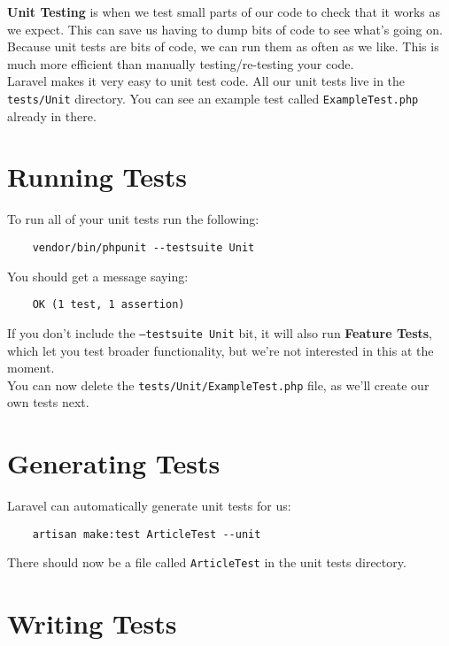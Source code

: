 \textbf{Unit Testing} is when we test small parts of our code to check that it works as we expect. This can save us having to dump bits of code to see what's going on.
\\

Because unit tests are bits of code, we can run them as often as we like. This is much more efficient than manually testing/re-testing your code.
\\

Laravel makes it very easy to unit test code. All our unit tests live in the \texttt{tests/Unit} directory. You can see an example test called \texttt{ExampleTest.php} already in there.

\section{Running Tests}

To run all of your unit tests run the following:

\begin{verbatim}
    vendor/bin/phpunit --testsuite Unit
\end{verbatim}

You should get a message saying:

\begin{verbatim}
    OK (1 test, 1 assertion)
\end{verbatim}

If you don't include the \texttt{--testsuite Unit} bit, it will also run \textbf{Feature Tests}, which let you test broader functionality, but we're not interested in this at the moment.
\\

You can now delete the \texttt{tests/Unit/ExampleTest.php} file, as we'll create our own tests next.


\section{Generating Tests}

Laravel can automatically generate unit tests for us:

\begin{verbatim}
    artisan make:test ArticleTest --unit
\end{verbatim}

There should now be a file called \texttt{ArticleTest} in the unit tests directory.


\section{Writing Tests}

